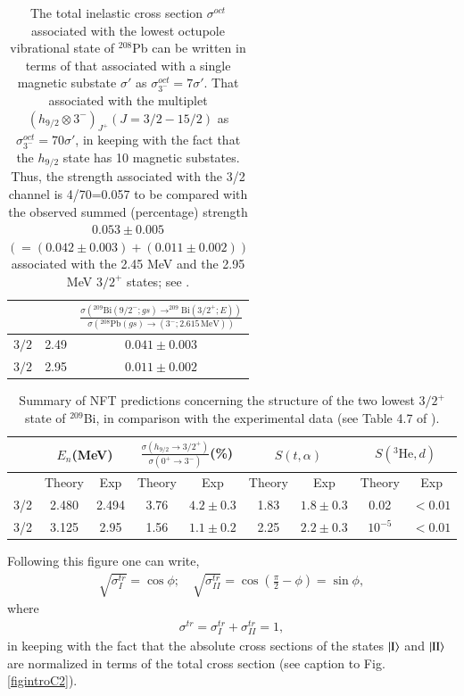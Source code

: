 \begin{table}
\begin{tabular}{|c|c|c|}
\hline 
 & & $\frac{\sigma\left(^{209}\text{Bi}(9/2^-;gs)\rightarrow^{209}\text{Bi}(3/2^+;E)\right)}{\sigma\left(^{208}\text{Pb}(gs)\rightarrow (3^-;2.615\, \text{MeV})\right)}$  \\
 \hline 
$3/2$ & 2.49 & $0.041\pm0.003$   \\ 
$3/2$ & 2.95 & $0.011\pm0.002$  \\ 
 \hline
\end{tabular}\caption{The total inelastic cross section $\sigma^{oct}$ associated with the lowest octupole vibrational state of $^{208}$Pb can be written in terms of that associated with a single magnetic substate $\sigma'$ as $\sigma_{3^-}^{oct}=7\sigma'$. That associated with the multiplet $(h_{9/2}\otimes 3^-)_{J^+} (J=3/2-15/2)$ as $\sigma_{3^-}^{oct}=70\sigma'$, in keeping with the fact that the $h_{9/2}$ state has 10 magnetic substates. Thus, the strength associated with the 3/2 channel is 4/70=0.057 to be compared with the observed summed (percentage) strength $0.053\pm0.005 $ $(=(0.042\pm0.003)+(0.011\pm0.002))$ associated with the 2.45 MeV and the 2.95 MeV $3/2^+$ states; see \cite{Bortignon:77}.}\label{tabintroC2}
\end{table}
\begin{table}
\begin{tabular}{|c|c|c|c|c|c|c|c|c|}
\hline
& \multicolumn{2}{|c}{$E_n$(MeV)} & \multicolumn{2}{|c}{$\frac{\sigma(h_{9/2}\rightarrow 3/2^+)}{\sigma(0^+\rightarrow 3^-)}$(\%)} & \multicolumn{2}{|c}{$S(t,\alpha)$}  & \multicolumn{2}{|c|}{$S(^3\text{He},d)$}   \\
\hline
&Theory  & Exp  & Theory  & Exp & Theory & Exp & Theory  & Exp  \\
\hline
3/2& 2.480 & 2.494  & 3.76  & $4.2\pm0.3$  & 1.83  & $1.8\pm0.3$ &0.02  & $<0.01$  \\
3/2& 3.125 & 2.95  & 1.56 & $1.1\pm0.2$  & 2.25  & $2.2\pm0.3$ & $10^{-5}$  & $<0.01$  \\
\hline
\end{tabular}\caption{Summary of NFT predictions concerning the structure of the two lowest $3/2^+$ state of $^{209}$Bi, in comparison with the experimental data (see Table 4.7 of \cite{Bortignon:77}).}\label{tabintroC3}
\end{table}
Following this figure  one can write,
\begin{align}
\sqrt{\sigma_I^{tr}}=\cos\phi;\quad \sqrt{\sigma_{II}^{tr}}=\cos\left(\frac{\pi}{2}-\phi\right)=\sin \phi,
\end{align}
where
\begin{align}
{\sigma^{tr}}={\sigma_I^{tr}}+{\sigma_{II}^{tr}}=1,
\end{align}
in keeping with the fact that the absolute cross sections of the states $|{\text{I}} \rangle$ and $|{\text{II}} \rangle$ are normalized in terms of the total cross section (see caption to Fig. \ref{figintroC2}).


